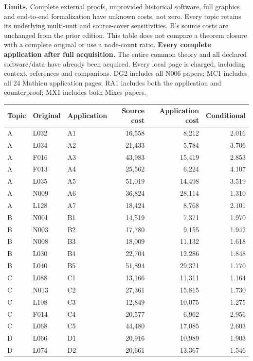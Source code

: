 \documentclass[11pt,a4paper]{article}
\newcommand{\tabsetup}{\small\setlength{\tabcolsep}{4pt}\renewcommand{\arraystretch}{1.10}}
\begin{document}
\textbf{Limits.} Complete external proofs, unprovided historical software, full graphics and end-to-end formalization have unknown costs, not zero. Every topic retains its underlying multi-unit and source-cover sensitivities. B's source costs are unchanged from the prior edition. This table does not compare a theorem closure with a complete original or use a node-count ratio.
\newpage
\textbf{Every complete application after full acquisition.}
The entire common theory and all declared software/data have already been acquired. Every local page is charged, including context, references and companions. DG2 includes all N006 papers; MC1 includes all 24 Mathieu application pages; RA1 includes both the application and counterproof; MX1 includes both Mixes papers.
\begin{center}\tabsetup\renewcommand{\arraystretch}{1.03}\begin{tabular}{lllrrr}\toprule
Topic & Original & Application & Source cost & Application cost & Conditional\\\midrule
A & L032 & A1 & 16,558 & 8,212 & 2.016 \\
A & L034 & A2 & 21,433 & 5,784 & 3.706 \\
A & F016 & A3 & 43,983 & 15,419 & 2.853 \\
A & F013 & A4 & 25,562 & 6,224 & 4.107 \\
A & L035 & A5 & 51,019 & 14,498 & 3.519 \\
A & N009 & A6 & 36,824 & 28,114 & 1.310 \\
A & L128 & A7 & 18,424 & 8,768 & 2.101 \\
B & N001 & B1 & 14,519 & 7,371 & 1.970 \\
B & N003 & B2 & 17,780 & 9,155 & 1.942 \\
B & N008 & B3 & 18,009 & 11,132 & 1.618 \\
B & L030 & B4 & 22,704 & 12,286 & 1.848 \\
B & L040 & B5 & 51,894 & 29,321 & 1.770 \\
C & L088 & C1 & 13,166 & 11,311 & 1.164 \\
C & N013 & C2 & 27,361 & 15,815 & 1.730 \\
C & L108 & C3 & 12,849 & 10,075 & 1.275 \\
C & F014 & C4 & 20,577 & 6,962 & 2.956 \\
C & L068 & C5 & 44,480 & 17,085 & 2.603 \\
D & L066 & D1 & 20,916 & 10,989 & 1.903 \\
D & L074 & D2 & 20,661 & 13,367 & 1.546 \\

\end{tabular}
\end{center}
\end{document}
